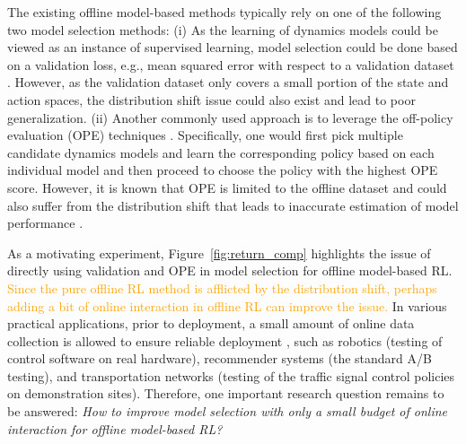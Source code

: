 The existing offline model-based methods typically rely on one of the following two model selection methods: (i) As the learning of dynamics models could be viewed as an instance of supervised learning, model selection could be done based on a validation loss, e.g., mean squared error with respect to a validation dataset \cite{janner2019trust, yu2020mopo}. However, as the validation dataset only covers a small portion of the state and action spaces, the distribution shift issue could also exist and lead to poor generalization.
(ii) Another commonly used approach is to leverage the off-policy evaluation (OPE) techniques \cite{paine2020hyperparameter, voloshin2019empirical}. Specifically, one would first pick multiple candidate dynamics models and learn the corresponding policy based on each individual model and then proceed to choose the policy with the highest OPE score. However, it is known that OPE is limited to the offline dataset and could also suffer from the distribution shift that leads to inaccurate estimation of model performance \cite{tang2021model}. 

As a motivating experiment, Figure~\ref{fig:return_comp} highlights the issue of directly using validation and OPE in model selection for offline model-based RL. \textcolor{orange}{Since the pure offline RL method is afflicted by the distribution shift, perhaps adding a bit of online interaction in offline RL can improve the issue.} In various practical applications, prior to deployment, a small amount of online data collection is allowed to ensure reliable deployment \cite{lee2022offline, zhao2022adaptive, konyushova2021active}, such as robotics (testing of control software on real hardware), recommender systems (the standard A/B testing), and transportation networks (testing of the traffic signal control policies on demonstration sites). 
Therefore, one important research question remains to be answered: \textit{How to improve model selection with only a small budget of online interaction for offline model-based RL?}

